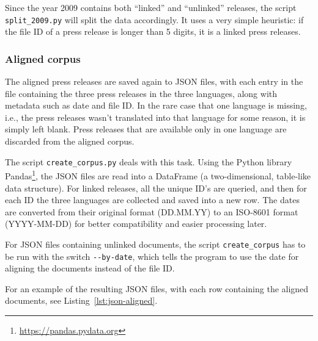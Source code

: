 Since the year 2009 contains both \enquote{linked} and \enquote{unlinked} releases, the script \texttt{split\_2009.py} will split the data accordingly. 
It uses a very simple heuristic: if the file ID of a press release is longer than 5 digits, it is a linked press releases.

\subsubsection{Aligned corpus}
The aligned press releases are saved again to JSON files, with each entry in the file containing the three press releases in the three languages, along with metadata such as date and file ID. 
In the rare case that one language is missing, i.e., the press releases wasn't translated into that language for some reason, it is simply left blank. 
Press releases that are available only in one language are discarded from the aligned corpus.

The script \texttt{create\_corpus.py} deals with this task.
Using the Python library Pandas\footnote{\url{https://pandas.pydata.org}}, the JSON files are read into a DataFrame (a two-dimensional, table-like data structure). 
For linked releases, all the unique ID's are queried, and then for each ID the three languages are collected and saved into a new row. 
The dates are converted from their original format (DD.MM.YY) to an ISO-8601 format (YYYY-MM-DD) \autocite{enwiki:1095673391} for better compatibility and easier processing later.

For JSON files containing unlinked documents, the script \texttt{create\_corpus} has to be run with the switch \texttt{-{}-by-date}, which tells the program to use the date for aligning the documents instead of the file ID.

For an example of the resulting JSON files, with each row containing the aligned documents, see Listing~\ref{lst:json-aligned}.



